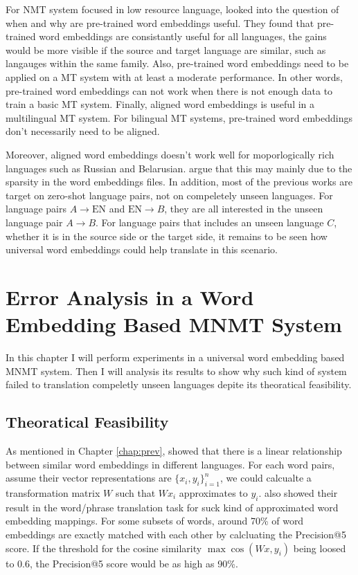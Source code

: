 \documentclass[thesis,fonts=libertine]{cluu}
\begin{document}
For NMT system focused in low resource language, \cite{Qi:2018aa} looked into the question of when and why are pre-trained word embeddings useful. They found that pre-trained word embeddings are consistantly useful for all languages, the gains would be more visible if the source and target language are similar, such as langauges within the same family. Also, pre-trained word embeddings need to be applied on a MT system with at least a moderate performance. In other words, pre-trained word embeddings can not work when there is not enough data to train a basic MT system. Finally, aligned word embeddings is useful in a multilingual MT system. For bilingual MT systems, pre-trained word embeddings don't necessarily need to be aligned.

Moreover, aligned word embeddings doesn't work well for moporlogically rich languages such as Russian and Belarusian. \cite{Qi:2018aa} argue that this may mainly due to the sparsity in the word embeddings files. In addition, most of the previous works are target on zero-shot language pairs, not on compeletely unseen languages. For language pairs $A \rightarrow \text{EN}$ and $\text{EN} \rightarrow B$, they are all interested in the unseen language pair $A \rightarrow B$. For language pairs that includes an unseen language $C$, whether it is in the source side or the target side, it remains to be seen how universal word embeddings could help translate in this scenario.

\chapter{Error Analysis in a Word Embedding Based MNMT System}
\label{chap:error_analysis}

In this chapter I will perform experiments in a universal word embedding based MNMT system. Then I will analysis its results to show why such kind of system failed to translation compeletly unseen languages depite its theoratical feasibility.

\section{Theoratical Feasibility}

As mentioned in Chapter \ref{chap:prev}, \cite{Mikolov:2013ac} showed that there is a linear relationship between similar word embeddings in different languages. For each word pairs, assume their vector representations are $\{x_i, y_i\}_{i=1}^n$, we could calcualte a transformation matrix $W$ such that $Wx_i$ approximates to $y_i$. \cite{Mikolov:2013ac} also showed their result in the word/phrase translation task for suck kind of approximated word embedding mappings. For some subsets of words, around 70\% of word embeddings are exactly matched with each other by calcluating the Precision@5 score. If the threshold for the cosine similarity $\max\cos(Wx, y_i)$ being loosed to 0.6, the Precision@5 score would be as high as 90\%.
\end{document}
